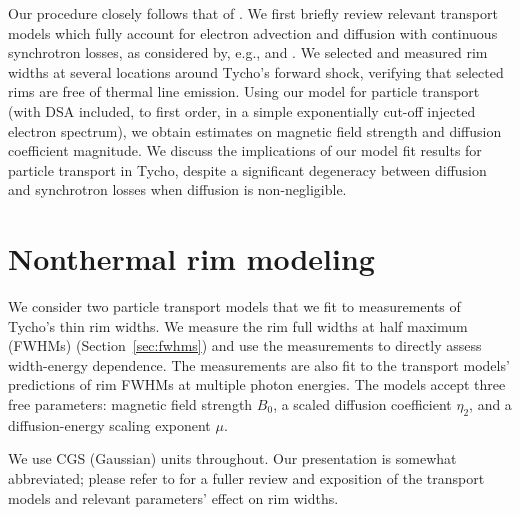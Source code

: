 \documentclass[iop, apj, numberedappendix, twocolappendix]{emulateapj}
\newcommand*{\mt}{\mathrm}
\newcommand*{\tsynch}{\tau_{\mt{synch}}}
\begin{document}
Our procedure closely follows that of .
We first briefly review relevant transport models which fully account for
electron advection and diffusion with continuous synchrotron losses, as
considered by, e.g., \citet[and references therein]{berezhko2004} and
\citet{rettig2012}.  We selected and measured rim widths at several locations
around Tycho's forward shock, verifying that selected rims are free of thermal
line emission.  Using our model for particle transport (with DSA included, to
first order, in a simple exponentially cut-off injected electron spectrum), we
obtain estimates on magnetic field strength and diffusion coefficient
magnitude. We discuss the implications of our model fit results for
particle transport in Tycho, despite a significant degeneracy between
diffusion and synchrotron losses when diffusion is non-negligible.

\section{Nonthermal rim modeling}\label{sec:models}

We consider two particle transport models that we fit to measurements of
Tycho's thin rim widths.  We measure the rim full widths at half maximum
(FWHMs) (Section~\ref{sec:fwhms}) and use the measurements to directly assess
width-energy dependence.  The measurements are also fit to the transport
models' predictions of rim FWHMs at multiple photon energies.  The models
accept three free parameters: magnetic field strength $B_0$, a scaled diffusion
coefficient $\eta_2$, and a diffusion-energy scaling exponent $\mu$.

We use CGS (Gaussian) units throughout.  Our presentation is somewhat
abbreviated; please refer to  for a fuller review and
exposition of the transport models and relevant parameters' effect on rim
widths.

\end{document}
